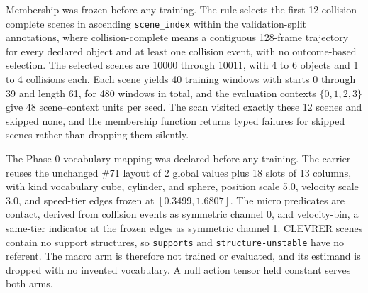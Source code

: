 Membership was frozen before any training. The rule selects the first 12 collision-complete scenes in ascending \texttt{scene\_index} within the validation-split annotations, where collision-complete means a contiguous 128-frame trajectory for every declared object and at least one collision event, with no outcome-based selection. The selected scenes are 10000 through 10011, with 4 to 6 objects and 1 to 4 collisions each. Each scene yields 40 training windows with starts 0 through 39 and length 61, for 480 windows in total, and the evaluation contexts $\{0,1,2,3\}$ give 48 scene--context units per seed. The scan visited exactly these 12 scenes and skipped none, and the membership function returns typed failures for skipped scenes rather than dropping them silently.

The Phase 0 vocabulary mapping was declared before any training. The carrier reuses the unchanged \#71 layout of 2 global values plus 18 slots of 13 columns, with kind vocabulary cube, cylinder, and sphere, position scale 5.0, velocity scale 3.0, and speed-tier edges frozen at $[0.3499, 1.6807]$. The micro predicates are contact, derived from collision events as symmetric channel 0, and velocity-bin, a same-tier indicator at the frozen edges as symmetric channel 1. CLEVRER scenes contain no support structures, so \texttt{supports} and \texttt{structure-unstable} have no referent. The macro arm is therefore not trained or evaluated, and its estimand is dropped with no invented vocabulary. A null action tensor held constant serves both arms.

